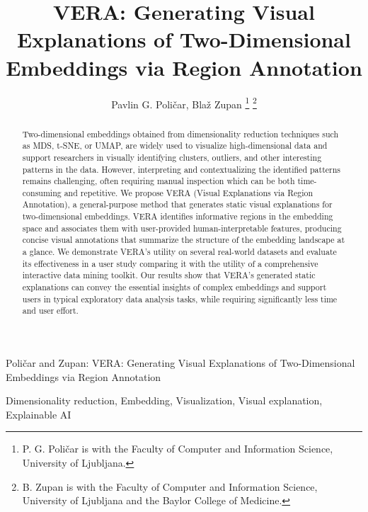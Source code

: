 \documentclass[lettersize,journal]{IEEEtran}
\begin{document}
\title{VERA: Generating Visual Explanations of Two-Dimensional Embeddings via Region Annotation}

\author{Pavlin G. Poli\v{c}ar, Bla\v{z} Zupan
\thanks{P. G. Poli\v{c}ar is with the Faculty of Computer and Information Science, University of Ljubljana.}%
\thanks{B. Zupan is with the Faculty of Computer and Information Science, University of Ljubljana and the Baylor College of Medicine.}}

\markboth{}%
{Poli\v{c}ar and Zupan: VERA: Generating Visual Explanations of Two-Dimensional Embeddings via Region Annotation}

\IEEEpubid{}

\maketitle

\begin{abstract}
Two-dimensional embeddings obtained from dimensionality reduction techniques such as MDS, t-SNE, or UMAP, are widely used to visualize high-dimensional data and support researchers in visually identifying clusters, outliers, and other interesting patterns in the data. However, interpreting and contextualizing the identified patterns remains challenging, often requiring manual inspection which can be both time-consuming and repetitive.
We propose VERA (Visual Explanations via Region Annotation), a general-purpose method that generates static visual explanations for two-dimensional embeddings.
VERA identifies informative regions in the embedding space and associates them with user-provided human-interpretable features, producing concise visual annotations that summarize the structure of the embedding landscape at a glance.
We demonstrate VERA's utility on several real-world datasets and evaluate its effectiveness in a user study comparing it with the utility of a comprehensive interactive data mining toolkit.
Our results show that VERA's generated static explanations can convey the essential insights of complex embeddings and support users in typical exploratory data analysis tasks, while requiring significantly less time and user effort.
\end{abstract}

\begin{IEEEkeywords}
Dimensionality reduction, Embedding, Visualization, Visual explanation, Explainable AI
\end{IEEEkeywords}
\end{document}
